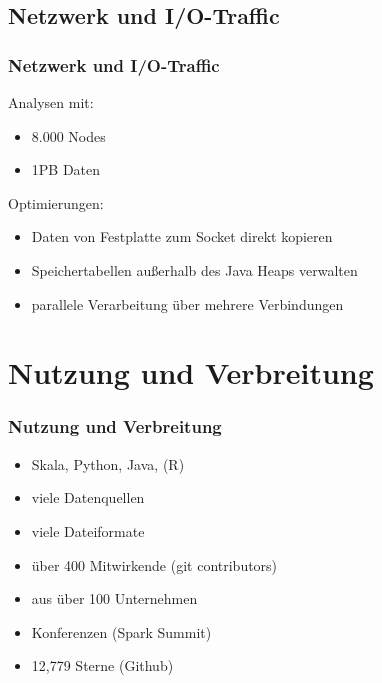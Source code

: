 \documentclass[hyperref={pdfpagelabels=false}]{beamer}
\begin{document}
 \subsection{Netzwerk und I/O-Traffic}
\begin{frame} [t]
\frametitle{Netzwerk und I/O-Traffic}
Analysen mit:
\begin{itemize}
	\item 8.000 Nodes
	\item 1PB Daten	
\end{itemize}

\vspace{0.4cm}
 {
Optimierungen:
\begin{itemize}
	\item Daten von Festplatte zum Socket direkt kopieren
	\item Speichertabellen außerhalb des Java Heaps verwalten
	\item parallele Verarbeitung über mehrere Verbindungen	
\end{itemize}
}
\end{frame}


\section{Nutzung und Verbreitung}
\begin{frame} [t]
\frametitle{Nutzung und Verbreitung}

\begin{itemize}
	\item Skala, Python, Java, (R)
	\item viele Datenquellen
	\item viele Dateiformate	
	\item über 400 Mitwirkende (git contributors)
	\item aus über 100 Unternehmen
	\item Konferenzen (Spark Summit)
	\item 12,779 Sterne (Github)
\end{itemize}

 {
	\begin{figure}[h]
	
	\end{figure}
}

\end{frame}
\end{document}
